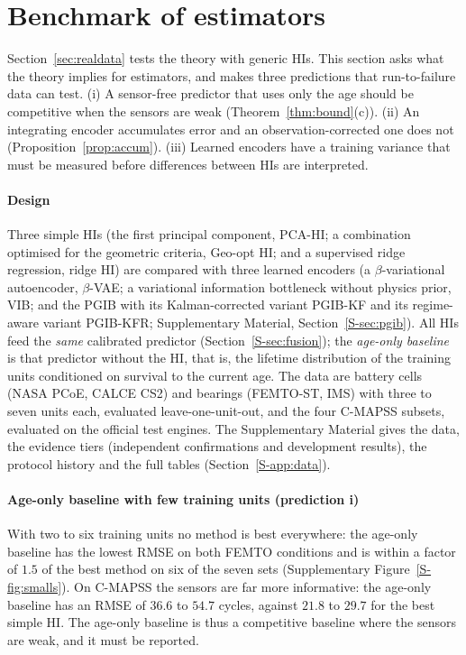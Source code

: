 \documentclass[preprint,12pt]{elsarticle}
\theoremstyle{definition}
\begin{document}
\section{Benchmark of estimators}
\label{sec:empirical}
Section~\ref{sec:realdata} tests the theory with generic HIs. This section asks what the theory implies for estimators, and makes three predictions that run-to-failure data can test. (i) A sensor-free predictor that uses only the age should be competitive when the sensors are weak (Theorem~\ref{thm:bound}(c)). (ii) An integrating encoder accumulates error and an observation-corrected one does not (Proposition~\ref{prop:accum}). (iii) Learned encoders have a training variance that must be measured before differences between HIs are interpreted.

\paragraph{Design} Three simple HIs (the first principal component, PCA-HI; a combination optimised for the geometric criteria, Geo-opt HI; and a supervised ridge regression, ridge HI) are compared with three learned encoders (a $\beta$-variational autoencoder, $\beta$-VAE; a variational information bottleneck without physics prior, VIB; and the PGIB with its Kalman-corrected variant PGIB-KF and its regime-aware variant PGIB-KFR; Supplementary Material, Section~\ref{S-sec:pgib}). All HIs feed the \emph{same} calibrated predictor (Section~\ref{S-sec:fusion}); the \emph{age-only baseline} is that predictor without the HI, that is, the lifetime distribution of the training units conditioned on survival to the current age. The data are battery cells (NASA PCoE, CALCE CS2) and bearings (FEMTO-ST, IMS) with three to seven units each, evaluated leave-one-unit-out, and the four C-MAPSS subsets, evaluated on the official test engines. The Supplementary Material gives the data, the evidence tiers (independent confirmations and development results), the protocol history and the full tables (Section~\ref{S-app:data}).

\paragraph{Age-only baseline with few training units (prediction i)} With two to six training units no method is best everywhere: the age-only baseline has the lowest RMSE on both FEMTO conditions and is within a factor of $1.5$ of the best method on six of the seven sets (Supplementary Figure~\ref{S-fig:smalls}). On C-MAPSS the sensors are far more informative: the age-only baseline has an RMSE of $36.6$ to $54.7$ cycles, against $21.8$ to $29.7$ for the best simple HI. The age-only baseline is thus a competitive baseline where the sensors are weak, and it must be reported.
\end{document}
